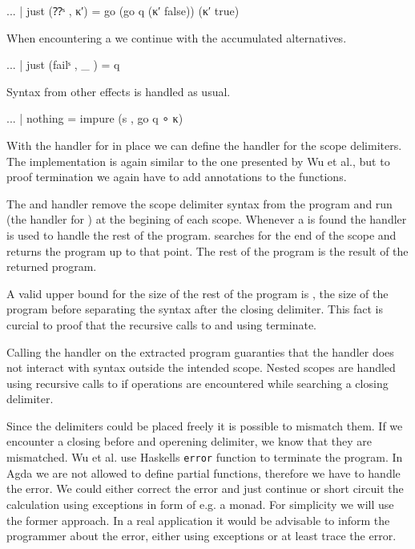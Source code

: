 \begin{AgdaAlign}
\begin{code}
    ... | just (⁇ˢ     , κ′)  = go (go q (κ′ false)) (κ′ true)
\end{code}
When encountering a  we continue with the accumulated
alternatives.

\begin{code}
    ... | just (failˢ  , _ )  = q
\end{code}
Syntax from other effects is handled as usual.

\begin{code}
    ... | nothing             = impure (s , go q ∘ κ)
\end{code}
\end{AgdaAlign}
With the handler for  in place we can define the handler for the
scope delimiters.
The implementation is again similar to the one presented by Wu et al., but to
proof termination we again have to add  annotations to the
functions.

The  and  handler remove the scope
delimiter syntax from the program and run  (the handler
for ) at the begining of each scope.
Whenever a  is found the handler  is
used to handle the rest of the program.
 searches for the end of the scope and returns the program
up to that point.
The rest of the program is the result of the returned program.

A valid upper bound for the size of the rest of the program is ,
the size of the program before separating the syntax after the closing delimiter.
This fact is curcial to proof that the recursive calls to  and
 using \AgdaFunction{>>=} terminate.

Calling the handler on the extracted program guaranties that the handler does
not interact with syntax outside the intended scope.
Nested scopes are handled using recursive calls to  if
 operations are encountered while searching a closing
delimiter.

Since the delimiters could be placed freely it is possible to mismatch them.
If we encounter a closing before and operening delimiter, we know that they are
mismatched.
Wu et al. use Haskells \texttt{error} function to terminate the program.
In Agda we are not allowed to define partial functions, therefore we have to
handle the error.
We could either correct the error and just continue or short circuit the
calculation using exceptions in form of e.g. a  monad.
For simplicity we will use the former approach.
In a real application it would be advisable to inform the programmer about the
error, either using exceptions or at least trace the error.

